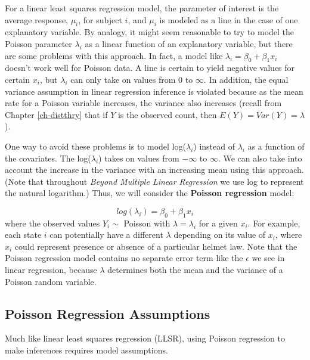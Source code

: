 \documentclass[
]{krantz}
\begin{document}
For a linear least squares regression model, the parameter of interest is the average response, \(\mu_i\), for subject \(i\), and \(\mu_i\) is modeled as a line in the case of one explanatory variable. By analogy, it might seem reasonable to try to model the Poisson parameter \(\lambda_i\) as a linear function of an explanatory variable, but there are some problems with this approach. In fact, a model like \(\lambda_i=\beta_0+\beta_1x_i\) doesn't work well for Poisson data. A line is certain to yield negative values for certain \(x_i\), but \(\lambda_i\) can only take on values from 0 to \(\infty\). In addition, the equal variance assumption in linear regression inference is violated because as the mean rate for a Poisson variable increases, the variance also increases (recall from Chapter \ref{ch-distthry} that if \(Y\) is the observed count, then \(E(Y)=Var(Y)=\lambda\)).

One way to avoid these problems is to model log(\(\lambda_i\)) instead of \(\lambda_i\) as a function of the covariates. The log(\(\lambda_i\)) takes on values from \(-\infty\) to \(\infty\). We can also take into account the increase in the variance with an increasing mean using this approach. (Note that throughout \emph{Beyond Multiple Linear Regression} we use log to represent the natural logarithm.) Thus, we will consider the \textbf{Poisson regression}  model:

\begin{equation*}
log(\lambda_i)=\beta_0+\beta_1 x_i
\end{equation*}
where the observed values \(Y_i \sim\) Poisson with \(\lambda=\lambda_i\) for a given \(x_i\). For example, each state \(i\) can potentially have a different \(\lambda\) depending on its value of \(x_i\), where \(x_i\) could represent presence or absence of a particular helmet law. Note that the Poisson regression model contains no separate error term like the \(\epsilon\) we see in linear regression, because \(\lambda\) determines both the mean and the variance of a Poisson random variable.

\hypertarget{poisson-regression-assumptions}{%
\subsection{Poisson Regression Assumptions}\label{poisson-regression-assumptions}}

Much like linear least squares regression (LLSR), using Poisson regression to make inferences requires model assumptions.
\end{document}
